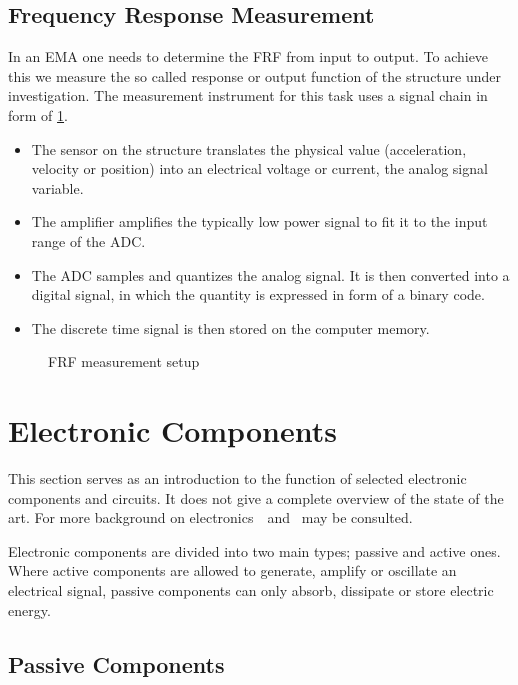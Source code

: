 \subsection{Frequency Response Measurement}

In an \ac{EMA} one needs to determine the \ac{FRF} from input to output. To achieve this we measure the so called response or output function of the structure under investigation. The measurement instrument for this task uses a signal chain in form of \ref{fig:measurement}.
\begin{itemize}
  \item The sensor on the structure translates the physical value (acceleration, velocity or position) into an electrical voltage or current, the analog signal variable.
  \item The amplifier amplifies the typically low power signal to fit it to the input range of the \ac{ADC}.
  \item The \ac{ADC} samples and quantizes the analog signal. It is then converted into a digital signal, in which the quantity is expressed in form of a binary code.
  \item The discrete time signal is then stored on the computer memory.
\end{itemize}

\begin{figure}[!htb]
  \centering
  
  \caption[Frequency Response Measurement]{\ac{FRF} measurement setup%
    \label{fig:measurement}}
\end{figure}

\section{Electronic Components}

This section serves as an introduction to the function of selected electronic components and circuits. It does not give a complete overview of the state of the art. For more background on electronics~\cite{Stiny2019AeB}~and~\cite{Tietze2008EC} may be consulted.

Electronic components are divided into two main types; passive and active ones. Where active components are allowed to generate, amplify or oscillate an electrical signal, passive components can only absorb, dissipate or store electric energy.

\subsection{Passive Components}

